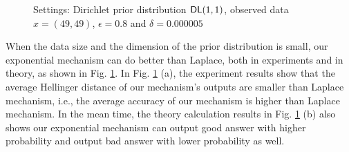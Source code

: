 \begin{figure}
\begin{center}
\centering
\caption{Settings: Dirichlet prior distribution $\mathsf{DL}(1,1)$, observed data $x = (49, 49) $, $\epsilon = 0.8$ and $\delta = 0.000005$}
\label{fig_theory_50_50}
\end{center}
\end{figure}

When the data size and the dimension of the prior distribution is small, our exponential mechanism can do better than Laplace, both in experiments and in theory, as shown in Fig. \ref{fig_theory_50_50}. In Fig. \ref{fig_theory_50_50} (a), the experiment results show that the average Hellinger distance of our mechanism's outputs are smaller than Laplace mechanism, i.e., the average accuracy of our mechanism is higher than Laplace mechanism. In the mean time, the theory calculation results in Fig. \ref{fig_theory_50_50} (b) also shows our exponential mechanism can output good answer with higher probability and output bad answer with lower probability as well.


